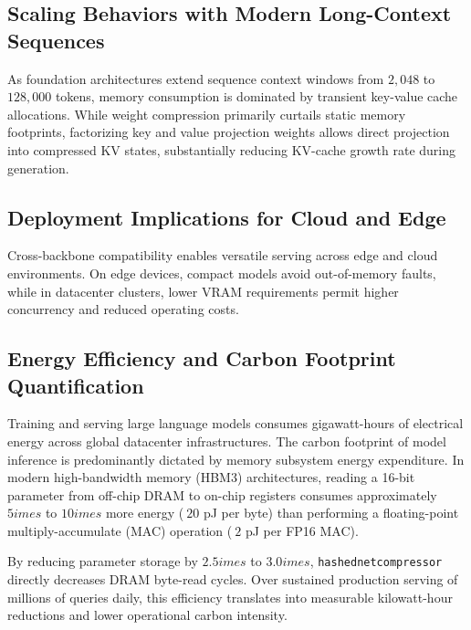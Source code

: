 \subsection{Scaling Behaviors with Modern Long-Context Sequences}
As foundation architectures extend sequence context windows from $2{,}048$ to $128{,}000$ tokens, memory consumption is dominated by transient key-value cache allocations. While weight compression primarily curtails static memory footprints, factorizing key and value projection weights allows direct projection into compressed KV states, substantially reducing KV-cache growth rate during generation.

\subsection{Deployment Implications for Cloud and Edge}
Cross-backbone compatibility enables versatile serving across edge and cloud environments. On edge devices, compact models avoid out-of-memory faults, while in datacenter clusters, lower VRAM requirements permit higher concurrency and reduced operating costs.

\subsection{Energy Efficiency and Carbon Footprint Quantification}
Training and serving large language models consumes gigawatt-hours of electrical energy across global datacenter infrastructures. The carbon footprint of model inference is predominantly dictated by memory subsystem energy expenditure. In modern high-bandwidth memory (HBM3) architectures, reading a 16-bit parameter from off-chip DRAM to on-chip registers consumes approximately $5	imes$ to $10	imes$ more energy ($~20$ pJ per byte) than performing a floating-point multiply-accumulate (MAC) operation ($~2$ pJ per FP16 MAC).

By reducing parameter storage by $2.5	imes$ to $3.0	imes$, \texttt{hashednetcompressor} directly decreases DRAM byte-read cycles. Over sustained production serving of millions of queries daily, this efficiency translates into measurable kilowatt-hour reductions and lower operational carbon intensity.
